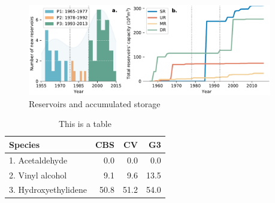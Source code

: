 \documentclass[9pt,twoside,lineno]{pnas-new}
\begin{document}
\begin{figure}
    \centering
    \includegraphics[width=0.95\textwidth]{../../figures/supplementary_information/reservoirs.pdf}
    \caption{Reservoirs and accumulated storage}
\end{figure}


\begin{table}\centering
\caption{This is a table}

\begin{tabular}{lrrr}
Species & CBS & CV & G3 \\
\midrule
1. Acetaldehyde & 0.0 & 0.0 & 0.0 \\
2. Vinyl alcohol & 9.1 & 9.6 & 13.5 \\
3. Hydroxyethylidene & 50.8 & 51.2 & 54.0\\
\bottomrule
\end{tabular}
\end{table}




\FloatBarrier




\end{document}
